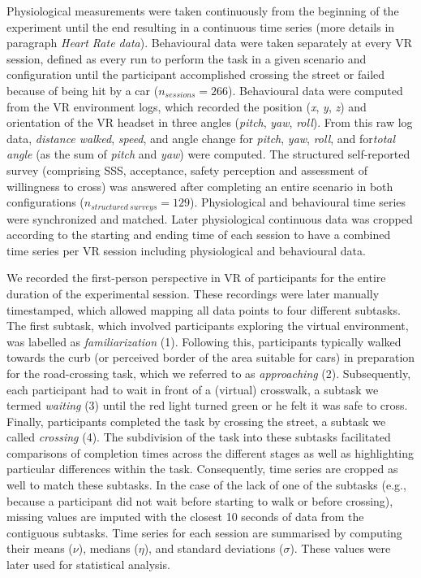 Physiological measurements were taken continuously from the beginning of the experiment until the end resulting in a continuous time series (more details in paragraph \emph{Heart Rate data}). Behavioural data were taken separately at every VR session, defined as every run to perform the task in a given scenario and configuration until the participant accomplished crossing the street or failed because of being hit by a car ($n_{sessions}=266$). Behavioural data were computed from the VR environment logs, which recorded the position (\emph{x}, \emph{y}, \emph{z}) and orientation of the VR headset in three angles (\emph{pitch}, \emph{yaw}, \emph{roll}). From this raw log data, \emph{distance walked}, \emph{speed}, and angle change for \emph{pitch}, \emph{yaw}, \emph{roll}, and for\emph{total angle} (as the sum of \emph{pitch} and \emph{yaw}) were computed.
The structured self-reported survey (comprising SSS, acceptance, safety perception and assessment of willingness to cross) was answered after completing an entire scenario in both configurations ($n_{structured\ surveys}=129$). Physiological and behavioural time series were synchronized and matched. Later physiological continuous data was cropped according to the starting and ending time of each session to have a combined time series per VR session including physiological and behavioural data.

We recorded the first-person perspective in VR of participants for the entire duration of the experimental session.
These recordings were later manually timestamped, which allowed mapping all data points to four different subtasks.
The first subtask, which involved participants exploring the virtual environment, was labelled as \emph{familiarization} (1). Following this, participants typically walked towards the curb (or perceived border of the area suitable for cars) in preparation for the road-crossing task, which we referred to as \emph{approaching} (2). Subsequently, each participant had to wait in front of a (virtual) crosswalk, a subtask we termed \emph{waiting} (3) until the red light turned green or he felt it was safe to cross. Finally, participants completed the task by crossing the street, a subtask we called \emph{crossing} (4). The subdivision of the task into these subtasks facilitated comparisons of completion times across the different stages as well as highlighting particular differences within the task. Consequently, time series are cropped as well to match these subtasks. In the case of the lack of one of the subtasks (e.g., because a participant did not wait before starting to walk or before crossing), missing values are imputed with the closest 10 seconds of data from the contiguous subtasks.
Time series for each session are summarised by computing their means ($\nu$), medians ($\eta$), and standard deviations ($\sigma$). These values were later used for statistical analysis.

